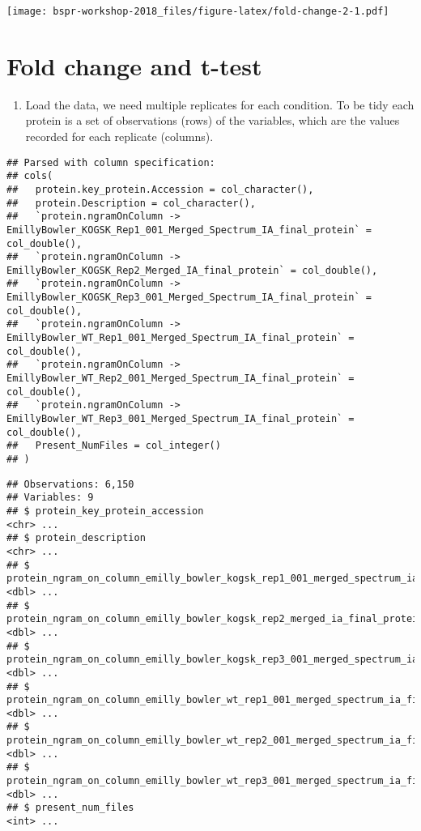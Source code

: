 \documentclass[12pt,]{book}
\providecommand{\tightlist}{%
  \setlength{\itemsep}{0pt}\setlength{\parskip}{0pt}}
\theoremstyle{definition}
\theoremstyle{definition}
\theoremstyle{definition}
\theoremstyle{remark}
\begin{document}
\texttt{[image: bspr-workshop-2018\_files/figure-latex/fold-change-2-1.pdf]}

\chapter{Fold change and t-test}\label{fold-change-and-t-test}

\begin{enumerate}
\def\labelenumi{\arabic{enumi}.}
\tightlist
\item
  Load the data, we need multiple replicates for each condition. To be
  tidy each protein is a set of observations (rows) of the variables,
  which are the values recorded for each replicate (columns).
\end{enumerate}

\begin{verbatim}
## Parsed with column specification:
## cols(
##   protein.key_protein.Accession = col_character(),
##   protein.Description = col_character(),
##   `protein.ngramOnColumn -> EmillyBowler_KOGSK_Rep1_001_Merged_Spectrum_IA_final_protein` = col_double(),
##   `protein.ngramOnColumn -> EmillyBowler_KOGSK_Rep2_Merged_IA_final_protein` = col_double(),
##   `protein.ngramOnColumn -> EmillyBowler_KOGSK_Rep3_001_Merged_Spectrum_IA_final_protein` = col_double(),
##   `protein.ngramOnColumn -> EmillyBowler_WT_Rep1_001_Merged_Spectrum_IA_final_protein` = col_double(),
##   `protein.ngramOnColumn -> EmillyBowler_WT_Rep2_001_Merged_Spectrum_IA_final_protein` = col_double(),
##   `protein.ngramOnColumn -> EmillyBowler_WT_Rep3_001_Merged_Spectrum_IA_final_protein` = col_double(),
##   Present_NumFiles = col_integer()
## )
\end{verbatim}

\begin{verbatim}
## Observations: 6,150
## Variables: 9
## $ protein_key_protein_accession                                                         <chr> ...
## $ protein_description                                                                   <chr> ...
## $ protein_ngram_on_column_emilly_bowler_kogsk_rep1_001_merged_spectrum_ia_final_protein <dbl> ...
## $ protein_ngram_on_column_emilly_bowler_kogsk_rep2_merged_ia_final_protein              <dbl> ...
## $ protein_ngram_on_column_emilly_bowler_kogsk_rep3_001_merged_spectrum_ia_final_protein <dbl> ...
## $ protein_ngram_on_column_emilly_bowler_wt_rep1_001_merged_spectrum_ia_final_protein    <dbl> ...
## $ protein_ngram_on_column_emilly_bowler_wt_rep2_001_merged_spectrum_ia_final_protein    <dbl> ...
## $ protein_ngram_on_column_emilly_bowler_wt_rep3_001_merged_spectrum_ia_final_protein    <dbl> ...
## $ present_num_files                                                                     <int> ...
\end{verbatim}
\end{document}
